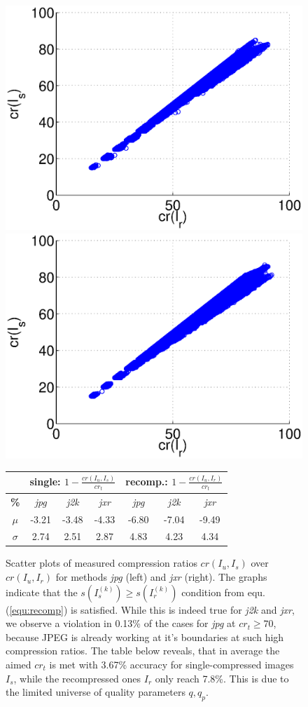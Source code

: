 \documentclass[10pt,twocolumn,letterpaper]{article}
\begin{document}
\begin{figure}
	\begin{small}
	
	\includegraphics[width=0.45\linewidth]{img/jpgData.eps}
	\includegraphics[width=0.45\linewidth]{img/jxrData.eps}
	
	\vspace{3mm}
	\begin{tabular}{c|c|c|c||c|c|c}
		& \multicolumn{3}{c||}{single: $1-\frac{cr(I_u, I_s)}{cr_t}$ } & \multicolumn{3}{c}{recomp.: $ 1-\frac{cr(I_u, I_r)}{cr_t}$} \\
		\hline
		\textbf{\%} & \emph{jpg} & \emph{j2k} & \emph{jxr} & \emph{jpg} & \emph{j2k} & \emph{jxr} \\
		\hline
		$ \mu $ & -3.21 & -3.48	&  -4.33 &  -6.80&   -7.04 &   -9.49 \\
		$ \sigma$ &2.74 &2.51 &  2.87 & 4.83  & 4.23  & 4.34 \\
	\end{tabular}
	
	
	\vspace{2mm}
	
	\end{small}
	
	\caption{Scatter plots of measured compression ratios $cr(I_u, I_s)$ over $cr(I_u, I_r)$ for methods \emph{jpg} (left) and \emph{jxr} (right). The graphs indicate that the $s(I_s^{(k)}) \geq s(I_r^{(k)})$ condition from equ. (\ref{equ:recomp}) is satisfied. While this is indeed true for \emph{j2k} and \emph{jxr}, we observe a violation in 0.13\% of the cases for \emph{jpg} at $cr_t \geq 70$, because JPEG is already working at it's boundaries at such high compression ratios. The table below reveals, that in average the aimed $cr_t$ is met with 3.67\% accuracy for single-compressed images $I_s$, while the recompressed ones $I_r$ only reach 7.8\%. This is due to the limited universe of quality parameters $q, q_p$.}
	
	
	\label{fig:dataDistribution}
\end{figure}
\end{document}
